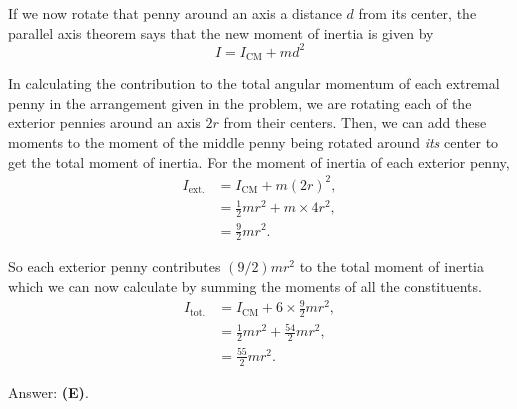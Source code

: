 \documentclass[11pt]{paper}
\newcommand{\answer}[1]{Answer: \textbf{(#1)}.}
\begin{document}
If we now rotate that penny around an axis a distance $d$ from its center, the parallel axis theorem says that the new moment of inertia is given by
\begin{equation}
I = I_{\text{CM}} + m d^2
\end{equation}

In calculating the contribution to the total angular momentum of each extremal penny in the arrangement given in the problem, we are rotating each of the exterior pennies around an axis $2r$ from their centers.  Then, we can add these moments to the moment of the middle penny being rotated around \emph{its} center to get the total moment of inertia.  For the moment of inertia of each exterior penny,
\begin{align}
I_\text{ext.} &= I_{\text{CM}} + m \left(2r\right)^2,\\
&= \frac{1}{2}mr^2 + m \times 4 r^2,\\
&= \frac{9}{2}mr^2.
\end{align}

So each exterior penny contributes $\left(9/2\right)mr^2$ to the total moment of inertia which we can now calculate by summing the moments of all the constituents.
\begin{align}
I_\text{tot.} &= I_{\text{CM}} + 6 \times \frac{9}{2}mr^2,\\
&= \frac{1}{2}mr^2 + \frac{54}{2}mr^2,\\
&= \frac{55}{2}mr^2.
\end{align}

\answer{E}
\end{document}
